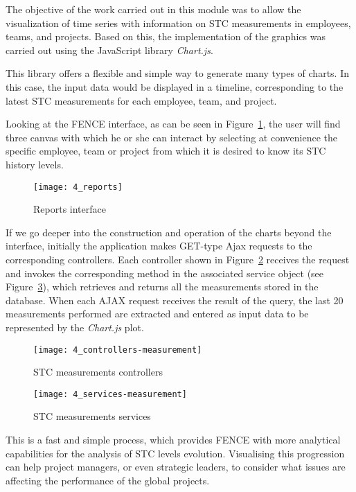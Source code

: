The objective of the work carried out in this module was to allow the visualization of time series with information on STC measurements in employees, teams, and projects. Based on this, the implementation of the graphics was carried out using the JavaScript library \emph{Chart.js}.

This library offers a flexible and simple way to generate many types of charts. In this case, the input data would be displayed in a timeline, corresponding to the latest STC measurements for each employee, team, and project.

Looking at the FENCE interface, as can be seen in Figure~\ref{fig:reports}, the user will find three canvas with which he or she can interact by selecting at convenience the specific employee, team or project from which it is desired to know its STC history levels.

\begin{figure}
	\centering
	\texttt{[image: 4\_reports]}
	\caption[Reports interface]{Reports interface}
	\label{fig:reports}
\end{figure}

If we go deeper into the construction and operation of the charts beyond the interface, initially the application makes GET-type Ajax requests to the corresponding controllers. Each controller shown in Figure~\ref{fig:measurements-controllers} receives the request and invokes the corresponding method in the associated service object (see Figure~\ref{fig:measurements-services}), which retrieves and returns all the measurements stored in the database. When each AJAX request receives the result of the query, the last 20 measurements performed are extracted and entered as input data to be represented by the \emph{Chart.js} plot.

\begin{figure}
	\centering
	\texttt{[image: 4\_controllers-measurement]}
	\caption[STC measurements controllers]{STC measurements controllers}
	\label{fig:measurements-controllers}
\end{figure}

\begin{figure}
	\centering
	\texttt{[image: 4\_services-measurement]}
	\caption[STC measurements services]{STC measurements services}
	\label{fig:measurements-services}
\end{figure}

This is a fast and simple process, which provides FENCE with more analytical capabilities for the analysis of STC levels evolution. Visualising this progression can help project managers, or even strategic leaders, to consider what issues are affecting the performance of the global projects. 


